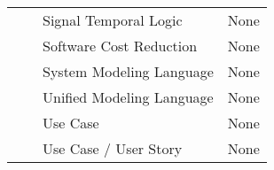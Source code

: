\begin{table}[]
{\begin{tabular}{clll}
\multicolumn{1}{c|}{}                      &                                                      & Signal Temporal Logic                   & None                                                                                                                                                                                                                                                                                                                                      \\
\multicolumn{1}{c|}{}                      &                                                      & Software Cost Reduction                 & None                                                                                                                                                                                                                                                                                                                                      \\
\multicolumn{1}{c|}{}                      &                                                      & System Modeling Language                & None                                                                                                                                                                                                                                                                                                                                      \\
\multicolumn{1}{c|}{}                      &                                                      & Unified Modeling Language               & None                                                                                                                                                                                                                                                                                                                                      \\
\multicolumn{1}{c|}{}                      &                                                      & Use Case                                & None                                                                                                                                                                                                                                                                                                                                      \\
\multicolumn{1}{c|}{}                      &                                                      & Use Case / User Story                   & None                                                                                                                                                                                                                                                                                                                                      \\

\end{tabular}}
\end{table}
